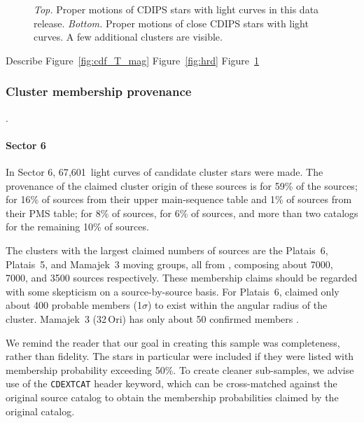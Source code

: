 \documentclass[12pt,twocolumn,tighten]{aastex62}
\newcommand{\sVInumberlcs}{67{,}601\ }  %
\begin{document}
\begin{figure}[!ht]
	\vspace{-0.8cm}
	\caption{
    {\it Top.} Proper motions of CDIPS stars with light curves in this
    data release.  {\it Bottom.} Proper motions of close CDIPS stars
    with light curves. A few additional clusters are visible.
	}
	\label{fig:propermotions}
\end{figure}

Describe
Figure~\ref{fig:cdf_T_mag}
Figure~\ref{fig:hrd}
Figure~\ref{fig:propermotions}


\subsubsection{Cluster membership provenance}.

\paragraph{Sector 6}
In Sector 6, \sVInumberlcs light curves of candidate cluster stars
were made. The provenance of the claimed cluster origin of these
sources is \citet{dias_proper_2014} for 59\% of the sources;
\citet{zari_3d_2018} for 16\% of sources from their upper
main-sequence table and 1\% of sources from their PMS table;
\citet{Kharchenko_et_al_2013} for 8\% of sources,
\citet{cantat-gaudin_gaia_2018} for 6\% of sources, and more than two
catalogs for the remaining 10\% of sources.

The clusters with the largest claimed numbers of sources are the
Platais~6, Platais~5, and Mamajek~3 moving groups, all from
\citet{dias_proper_2014}, composing about 7000, 7000, and 3500 sources
respectively. These membership claims should be regarded with some
skepticism on a source-by-source basis.  For Platais~6,
\citet{Kharchenko_et_al_2013} claimed only about 400 probable members
(1$\sigma$) to exist within the angular radius of the cluster.
Mamajek~3 (32$\,$Ori) has only about 50 confirmed members
\citep{bell_32ori_2017}.

We remind the reader that our goal in creating this sample was
completeness, rather than fidelity. The \citet{dias_proper_2014} stars
in particular were included if they were listed with membership
probability exceeding 50\%.  To create cleaner sub-samples, we advise
use of the \texttt{CDEXTCAT} header keyword, which can be
cross-matched against the original source catalog to obtain the
membership probabilities claimed by the original catalog.
\end{document}

